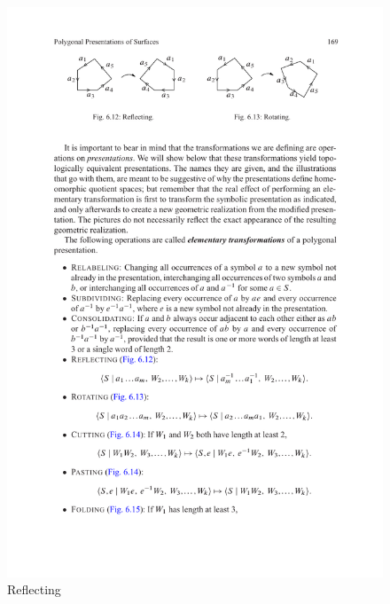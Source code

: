 \begin{figure}[htbp]
\centering
\begin{minipage}[b]{200pt}
\centering
\includegraphics{reflecting.pdf}
\caption{Reflecting}
\end{minipage}
\hspace {20pt}
\begin{minipage}[b]{200pt}
\centering

\end{minipage}
\end{figure}
